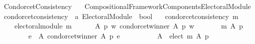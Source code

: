 %
\begin{isabellebody}%
%
%
\isadelimtheory
%
\endisadelimtheory
%
\isatagtheory
{}\isamarkupfalse%
\ Condorcet{\isacharunderscore}{\kern0pt}Consistency\isanewline
\ \ \ {\isachardoublequoteopen}{\isachardot}{\kern0pt}{\isachardot}{\kern0pt}{\isacharslash}{\kern0pt}Compositional{\isacharunderscore}{\kern0pt}Framework{\isacharslash}{\kern0pt}Components{\isacharslash}{\kern0pt}Electoral{\isacharunderscore}{\kern0pt}Module{\isachardoublequoteclose}\isanewline
\isanewline
{}%
\endisatagtheory
{\isafoldtheory}%
%
\isadelimtheory
\isanewline
%
\endisadelimtheory
\isanewline
{}\isamarkupfalse%
\ condorcet{\isacharunderscore}{\kern0pt}consistency\ {\isacharcolon}{\kern0pt}{\isacharcolon}{\kern0pt}\ {\isachardoublequoteopen}{\isacharprime}{\kern0pt}a\ Electoral{\isacharunderscore}{\kern0pt}Module\ {\isasymRightarrow}\ bool{\isachardoublequoteclose}\ \isanewline
\ \ {\isachardoublequoteopen}condorcet{\isacharunderscore}{\kern0pt}consistency\ m\ {\isasymequiv}\isanewline
\ \ \ \ electoral{\isacharunderscore}{\kern0pt}module\ m\ {\isasymand}\isanewline
\ \ \ \ {\isacharparenleft}{\kern0pt}{\isasymforall}\ A\ p\ w{\isachardot}{\kern0pt}\ condorcet{\isacharunderscore}{\kern0pt}winner\ A\ p\ w\ {\isasymlongrightarrow}\isanewline
\ \ \ \ \ \ {\isacharparenleft}{\kern0pt}m\ A\ p\ {\isacharequal}{\kern0pt}\isanewline
\ \ \ \ \ \ \ \ {\isacharparenleft}{\kern0pt}{\isacharbraceleft}{\kern0pt}e\ {\isasymin}\ A{\isachardot}{\kern0pt}\ condorcet{\isacharunderscore}{\kern0pt}winner\ A\ p\ e{\isacharbraceright}{\kern0pt}{\isacharcomma}{\kern0pt}\isanewline
\ \ \ \ \ \ \ \ \ \ A\ {\isacharminus}{\kern0pt}\ {\isacharparenleft}{\kern0pt}elect\ m\ A\ p{\isacharparenright}{\kern0pt}{\isacharcomma}{\kern0pt}\isanewline
\ \ \ \ \ \ \ \ \ \ {\isacharbraceleft}{\kern0pt}{\isacharbraceright}{\kern0pt}{\isacharparenright}{\kern0pt}{\isacharparenright}{\kern0pt}{\isacharparenright}{\kern0pt}{\isachardoublequoteclose}\isanewline
%
\isadelimtheory
\isanewline
%
\endisadelimtheory
%
\isatagtheory
{}\isamarkupfalse%
%
\endisatagtheory
{\isafoldtheory}%
%
\isadelimtheory
%
\endisadelimtheory
%
\end{isabellebody}%
\endinput
